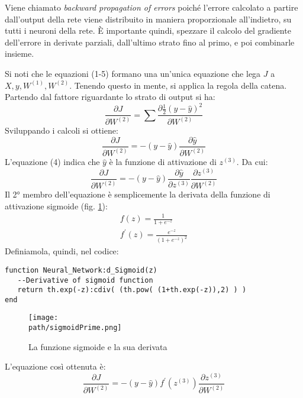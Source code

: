 Viene chiamato \emph{backward propagation of errors} poiché l'errore calcolato a partire dall'output della rete viene distribuito in maniera proporzionale all'indietro, su tutti i neuroni della rete. È importante quindi, spezzare il calcolo del gradiente dell'errore in derivate parziali, dall'ultimo strato fino al primo, e poi combinarle insieme.

Si noti che le equazioni (1-5) formano una un'unica equazione che lega $J$ a $X, y, W^{(1)}, W^{(2)}$. Tenendo questo in mente, si applica la regola della catena. \\
Partendo dal fattore riguardante lo strato di output si ha:
$$
\frac{\partial J}{\partial W^{(2)}} = \sum \frac{\partial \frac{1}{2}(y-\hat{y})^2}{\partial W^{(2)}}
$$
Sviluppando i calcoli si ottiene:
$$
\frac{\partial J}{\partial W^{(2)}} = -(y-\hat{y}) \frac{\partial \hat{y}}{\partial W^{(2)}}
$$
L'equazione (4) indica che $\hat{y}$ è la funzione di attivazione di $z^{(3)}$. Da cui:
$$
\frac{\partial J}{\partial W^{(2)}} =
-(y-\hat{y})
\frac{\partial \hat{y}}{\partial z^{(3)}}
\frac{\partial z^{(3)}}{\partial W^{(2)}}
$$
Il 2° membro dell'equazione è semplicemente la derivata della funzione di attivazione sigmoide (fig. \ref{fig:sigmoidPrime}):
\begin{align*}
f(z) = \frac{1}{1+e^{-z}}\\
f^\prime(z) = \frac{e^{-z}}{(1+e^{-z})^2}
\end{align*}
Definiamola, quindi, nel codice:
\begin{lstlisting}[language={[5.2]Lua}]
function Neural_Network:d_Sigmoid(z)
   --Derivative of sigmoid function
   return th.exp(-z):cdiv( (th.pow( (1+th.exp(-z)),2) ) )
end
\end{lstlisting}
\begin{figure}[h!]
 \centering
 \texttt{[image: \\path/sigmoidPrime.png]}
 \caption{La funzione sigmoide e la sua derivata}
 \label{fig:sigmoidPrime}
\end{figure}

L'equazione così ottenuta è:
$$
\frac{\partial J}{\partial W^{(2)}}=
-(y-\hat{y}) f^\prime(z^{(3)}) \frac{\partial z^{(3)}}{\partial W^{(2)}}
$$

